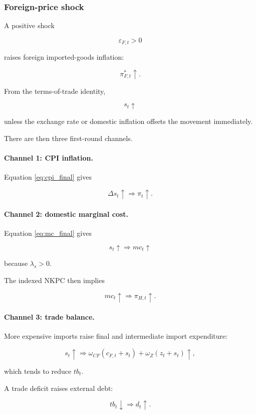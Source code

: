 \subsubsection{Foreign-price shock}

A positive shock

\[
\varepsilon_{F,t}>0
\]

raises foreign imported-goods inflation:

\[
\pi_{F,t}^{*}\uparrow.
\]

From the terms-of-trade identity,

\[
s_t\uparrow
\]

unless the exchange rate or domestic inflation offsets the movement
immediately.

There are then three first-round channels.

\paragraph{Channel 1: CPI inflation.}

Equation \eqref{eq:cpi_final} gives

\[
\Delta s_t\uparrow
\Rightarrow
\pi_t\uparrow.
\]

\paragraph{Channel 2: domestic marginal cost.}

Equation \eqref{eq:mc_final} gives

\[
s_t\uparrow
\Rightarrow
mc_t\uparrow
\]

because \(\lambda_s>0\).

The indexed NKPC then implies

\[
mc_t\uparrow
\Rightarrow
\pi_{H,t}\uparrow.
\]

\paragraph{Channel 3: trade balance.}

More expensive imports raise final and intermediate import expenditure:

\[
s_t\uparrow
\Rightarrow
\omega_{CF}(c_{F,t}+s_t)
+
\omega_Z(z_t+s_t)
\uparrow,
\]

which tends to reduce \(tb_t\).

A trade deficit raises external debt:

\[
tb_t\downarrow
\Rightarrow
d_t\uparrow.
\]

